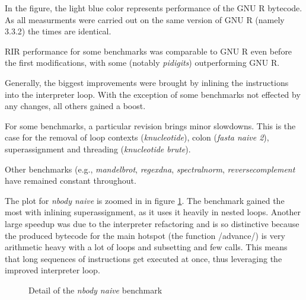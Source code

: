 In the figure, the light blue color represents performance of the GNU R bytecode. As all measurments were carried out on the same version of GNU R (namely 3.3.2) the times are identical.

RIR performance for some benchmarks was comparable to GNU R even before the first modifications, with some (notably \emph{pidigits}) outperforming GNU R.

Generally, the biggest improvements were brought by inlining the instructions into the interpreter loop. With the exception of some benchmarks not effected by any changes, all others gained a boost.

For some benchmarks, a particular revision brings minor slowdowns. This is the case for the removal of loop contexts (\emph{knucleotide}), colon (\emph{fasta naive 2}), superassignment and threading (\emph{knucleotide brute}).

Other benchmarks (e.g., \emph{mandelbrot}, \emph{regexdna}, \emph{spectralnorm}, \emph{reversecomplement} have remained constant throughout.

The plot for \emph{nbody naive} is zoomed in in figure \ref{fig:nbody}. The benchmark gained the most with inlining superassignment, as it uses it heavily in nested loops. Another large speedup was due to the interpreter refactoring and is so distinctive because the produced bytecode for the main hotspot (the function \rinline/advance/) is very arithmetic heavy with a lot of loops and subsetting and few calls. This means that long sequences of instructions get executed at once, thus leveraging the improved interpreter loop.

\begin{figure}[htbp]
  \caption{\label{fig:nbody}Detail of the \emph{nbody naive} benchmark}
  \centering
\end{figure}

